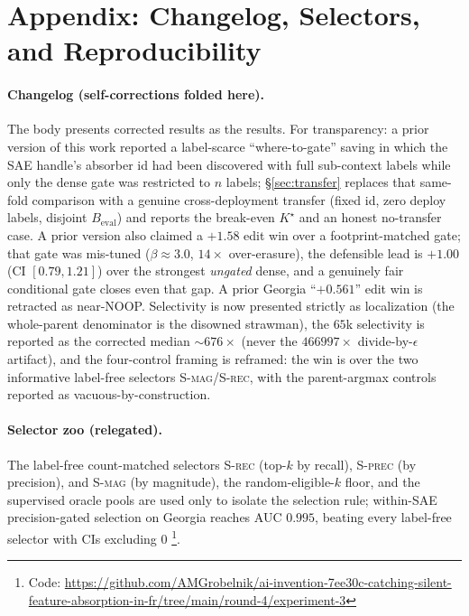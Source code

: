 \documentclass[11pt,letterpaper]{article}
\begin{document}
\appendix
\section{Appendix: Changelog, Selectors, and Reproducibility}
\label{sec:appendix}

\paragraph{Changelog (self-corrections folded here).} The body presents corrected results as the results. For transparency: a prior version of this work reported a label-scarce ``where-to-gate'' saving in which the SAE handle's absorber id had been discovered with full sub-context labels while only the dense gate was restricted to $n$ labels; \S\ref{sec:transfer} replaces that same-fold comparison with a genuine cross-deployment transfer (fixed id, zero deploy labels, disjoint $B_{\text{eval}}$) and reports the break-even $K^\star$ and an honest no-transfer case. A prior version also claimed a $+1.58$ edit win over a footprint-matched gate; that gate was mis-tuned ($\beta\approx3.0$, $14\times$ over-erasure), the defensible lead is $+1.00$ (CI $[0.79,1.21]$) over the strongest \emph{ungated} dense, and a genuinely fair conditional gate closes even that gap. A prior Georgia ``$+0.561$'' edit win is retracted as near-NOOP. Selectivity is now presented strictly as localization (the whole-parent denominator is the disowned strawman), the $65$k selectivity is reported as the corrected median $\sim676\times$ (never the $466997\times$ divide-by-$\epsilon$ artifact), and the four-control framing is reframed: the win is over the two informative label-free selectors \textsc{S-mag}/\textsc{S-rec}, with the parent-argmax controls reported as vacuous-by-construction.

\paragraph{Selector zoo (relegated).} The label-free count-matched selectors \textsc{S-rec} (top-$k$ by recall), \textsc{S-prec} (by precision), and \textsc{S-mag} (by magnitude), the random-eligible-$k$ floor, and the supervised oracle pools are used only to isolate the selection rule; within-SAE precision-gated selection on Georgia reaches AUC $0.995$, beating every label-free selector with CIs excluding $0$ \footnote{Code: \url{https://github.com/AMGrobelnik/ai-invention-7ee30c-catching-silent-feature-absorption-in-fr/tree/main/round-4/experiment-3}}.
\end{document}
